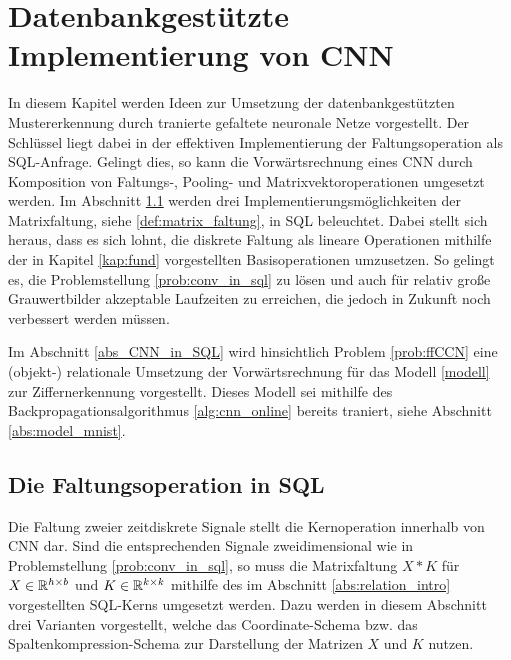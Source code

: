 \chapter{Datenbankgestützte Implementierung von CNN}
\label{kap:CNN_in_SQL}
In diesem Kapitel werden Ideen zur Umsetzung der datenbankgestützten Mustererkennung durch tranierte gefaltete neuronale Netze vorgestellt. Der Schlüssel liegt dabei in der effektiven Implementierung der Faltungsoperation als SQL-Anfrage. Gelingt dies, so kann die Vorwärtsrechnung eines CNN durch Komposition von Faltungs-, Pooling- und Matrixvektoroperationen umgesetzt werden. Im Abschnitt \ref{abs:conv_in_sql} werden drei Implementierungsmöglichkeiten der Matrixfaltung, siehe \ref{def:matrix_faltung}, in SQL beleuchtet. Dabei stellt sich heraus, dass es sich lohnt, die diskrete Faltung als lineare Operationen mithilfe der in Kapitel \ref{kap:fund} vorgestellten Basisoperationen umzusetzen. So gelingt es, die Problemstellung \ref{prob:conv_in_sql} zu lösen und auch für relativ große Grauwertbilder akzeptable Laufzeiten zu erreichen, die jedoch in Zukunft noch verbessert werden müssen.

Im Abschnitt \ref{abs_CNN_in_SQL} wird hinsichtlich Problem \ref{prob:ffCCN} eine (objekt-) relationale Umsetzung der Vorwärtsrechnung für das Modell \ref{modell} zur Ziffernerkennung vorgestellt. Dieses Modell sei mithilfe des Backpropagationsalgorithmus \ref{alg:cnn_online} bereits traniert, siehe Abschnitt \ref{abs:model_mnist}.
\section{Die Faltungsoperation in SQL}
\label{abs:conv_in_sql}
Die Faltung zweier zeitdiskrete Signale stellt die Kernoperation innerhalb von CNN dar. Sind die entsprechenden Signale zweidimensional wie in Problemstellung \ref{prob:conv_in_sql}, so muss die Matrixfaltung $X \ast K$ für $X \in \mathbb{R}^{h \times b}$ und $K \in \mathbb{R}^{k \times k}$ mithilfe des im Abschnitt \ref{abs:relation_intro} vorgestellten SQL-Kerns umgesetzt werden. Dazu werden in diesem Abschnitt drei Varianten vorgestellt, welche das Coordinate-Schema bzw. das Spaltenkompression-Schema zur Darstellung der Matrizen $X$ und $K$ nutzen. 
